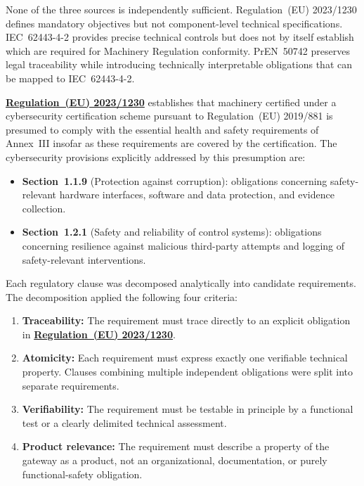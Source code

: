None of the three sources is independently sufficient. Regulation~(EU) 2023/1230 defines mandatory objectives but not component-level technical specifications. IEC~62443-4-2 provides precise technical controls but does not by itself establish which are required for Machinery Regulation conformity. PrEN~50742 preserves legal traceability while introducing technically interpretable obligations that can be mapped to IEC~62443-4-2.


\hyperref[subsec:eu_machinery_regulation]{\textbf{Regulation~(EU) 2023/1230}} establishes that machinery certified under a cybersecurity certification scheme pursuant to Regulation~(EU) 2019/881 is presumed to comply with the essential health and safety requirements of Annex~III insofar as these requirements are covered by the certification. The cybersecurity provisions explicitly addressed by this presumption are:

\begin{itemize}
	\item \textbf{Section~1.1.9} (Protection against corruption): obligations concerning safety-relevant hardware interfaces, software and data protection, and evidence collection.
	\item \textbf{Section~1.2.1} (Safety and reliability of control systems): obligations concerning resilience against malicious third-party attempts and logging of safety-relevant interventions.
\end{itemize}



Each regulatory clause was decomposed analytically into candidate requirements. The decomposition applied the following four criteria:

\begin{enumerate}
	\item \textbf{Traceability:} The requirement must trace directly to an explicit obligation in \hyperref[subsec:eu_machinery_regulation]{\textbf{Regulation~(EU) 2023/1230}}.
	\item \textbf{Atomicity:} Each requirement must express exactly one verifiable technical property. Clauses combining multiple independent obligations were split into separate requirements.
	\item \textbf{Verifiability:} The requirement must be testable in principle by a functional test or a clearly delimited technical assessment.
	\item \textbf{Product relevance:} The requirement must describe a property of the gateway as a product, not an organizational, documentation, or purely functional-safety obligation.
\end{enumerate}



